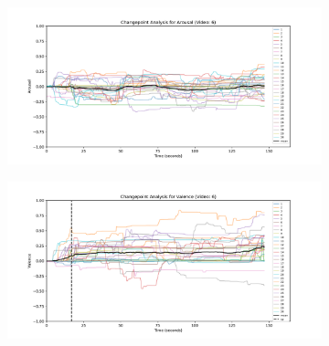 \documentclass[11pt, letterpaper]{article}
\begin{document}
\begin{figure}
        \centering
    \begin{subfigure}[t]{0.49\textwidth}
        \centering
        \includegraphics[width=\linewidth]{changepoints_V6_arousal_avg_all_data} 
        \caption{} \label{fig:changepoints_V6_arousal_avg_all_data}
    \end{subfigure}
    \hfill
    \begin{subfigure}[t]{0.49\textwidth}
        \centering
        \includegraphics[width=\linewidth]{changepoints_V6_valence_avg_all_data} 
        \caption{} \label{fig:changepoints_V6_valence_avg_all_data}
    \end{subfigure}

    \vspace{1cm}
    

\end{figure}
\end{document}
